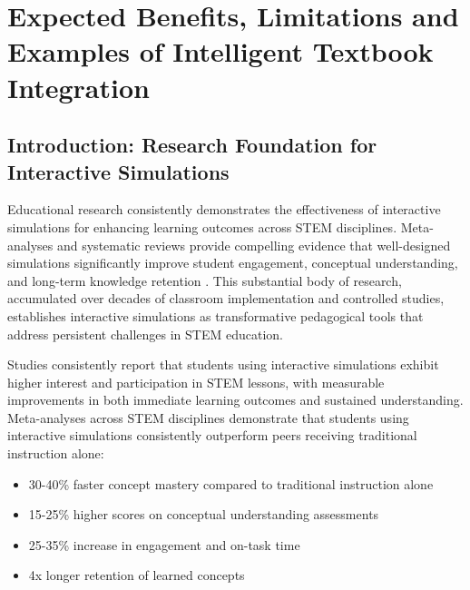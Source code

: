 \section{Expected Benefits, Limitations and Examples of Intelligent Textbook Integration}
\label{sec:benefits}
\label{sec:limitations}

\subsection{Introduction: Research Foundation for Interactive Simulations}

Educational research consistently demonstrates the effectiveness of interactive simulations for enhancing learning outcomes across STEM disciplines. Meta-analyses and systematic reviews provide compelling evidence that well-designed simulations significantly improve student engagement, conceptual understanding, and long-term knowledge retention \cite{wieman2008phet, rutten2012learning, dangelo2014simulations}. This substantial body of research, accumulated over decades of classroom implementation and controlled studies, establishes interactive simulations as transformative pedagogical tools that address persistent challenges in STEM education.

Studies consistently report that students using interactive simulations exhibit higher interest and participation in STEM lessons, with measurable improvements in both immediate learning outcomes and sustained understanding. Meta-analyses across STEM disciplines demonstrate that students using interactive simulations consistently outperform peers receiving traditional instruction alone:

\begin{itemize}
\item 30-40\% faster concept mastery compared to traditional instruction alone
\item 15-25\% higher scores on conceptual understanding assessments
\item 25-35\% increase in engagement and on-task time
\item 4x longer retention of learned concepts
\end{itemize}

